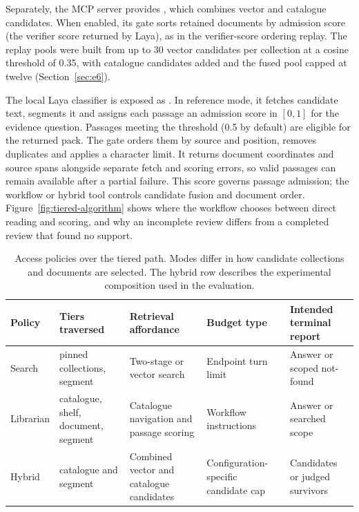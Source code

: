 Separately, the MCP server provides , which combines
vector and catalogue candidates. When enabled, its gate sorts retained
documents by admission score (the verifier score returned by Laya), as in the
verifier-score ordering replay. The replay pools were built from up to 30 vector candidates per collection at a
cosine threshold of 0.35, with catalogue candidates added and the fused pool
capped at twelve (Section~\ref{sec:e6}).

The local Laya classifier \cite{laya} is exposed as
. In reference mode, it fetches candidate text, segments
it and assigns each passage an admission score in $[0,1]$ for the evidence
question. Passages meeting the threshold (0.5 by default) are eligible for
the returned pack. The gate orders them by source and position, removes
duplicates and applies a character limit. It returns document coordinates
and source spans alongside separate fetch and scoring errors, so valid
passages can remain available after a partial failure. This score governs
passage admission; the workflow or hybrid tool controls candidate fusion
and document order. Figure~\ref{fig:tiered-algorithm} shows where the
workflow chooses between direct reading and scoring, and why an incomplete
review differs from a completed review that found no support.

\begin{table}[t]
\centering
\small
\setlength{\tabcolsep}{5pt}
\caption{Access policies over the tiered path. Modes differ in how candidate collections and documents are selected.
The hybrid row describes the experimental composition used in the evaluation.}
\label{tab:lanes}
\begin{tabular}{@{}>{\raggedright\arraybackslash}p{}>{\raggedright\arraybackslash}p{}>{\raggedright\arraybackslash}p{}>{\raggedright\arraybackslash}p{}>{\raggedright\arraybackslash}p{}@{}}
\toprule
Policy & Tiers traversed & Retrieval affordance & Budget type & Intended terminal report\\
\midrule
Search & pinned collections, segment & Two-stage or vector search & Endpoint turn limit & Answer or scoped not-found\\
Librarian & catalogue, shelf, document, segment & Catalogue navigation and passage scoring & Workflow instructions & Answer or searched scope\\
Hybrid & catalogue and segment & Combined vector and catalogue candidates & Configuration-specific candidate cap & Candidates or judged survivors\\
\bottomrule
\end{tabular}
\end{table}


